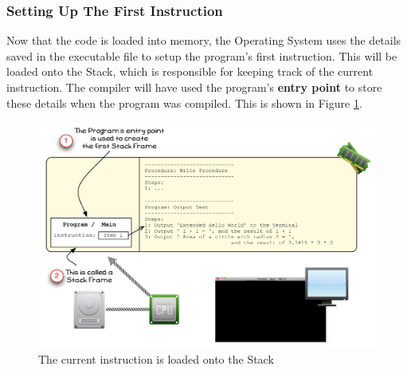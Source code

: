 \clearpage
\subsubsection{Setting Up The First Instruction} %
\label{ssub:setting_up_the_first_instruction}

Now that the code is loaded into memory, the Operating System uses the details saved in the executable file to setup the program's first instruction. This will be loaded onto the Stack, which is responsible for keeping track of the current instruction. The compiler will have used the program's \textbf{entry point} to store these details when the program was compiled. This is shown in Figure \ref{fig:program-creation-visualise-helloworld-3}.

\begin{figure}[htbp]
   \centering
   \includegraphics[width=\textwidth]{./topics/program-creation/images/ProgramExecution03} 
   \caption{The current instruction is loaded onto the Stack}
   \label{fig:program-creation-visualise-helloworld-3}
\end{figure}

